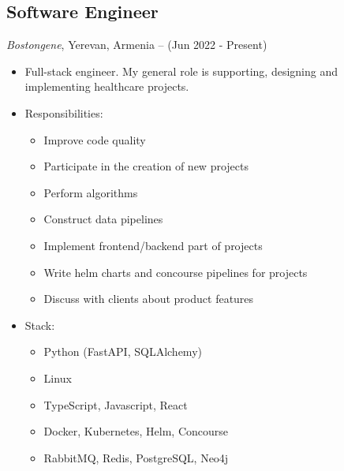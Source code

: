 \documentclass{article}
\begin{document}
\subsection*{Software Engineer}
\textit{Bostongene}, Yerevan, Armenia – (Jun 2022 - Present)
\begin{itemize}
    \item Full-stack engineer. My general role is supporting, designing and implementing healthcare projects. 
    \item Responsibilities:
    \begin{itemize}
        \item Improve code quality
        \item Participate in the creation of new projects
        \item Perform algorithms
        \item Construct data pipelines
        \item Implement frontend/backend part of projects
        \item Write helm charts and concourse pipelines for projects
        \item Discuss with clients about product features
    \end{itemize}
    \item Stack:
    \begin{itemize}
        \item Python (FastAPI, SQLAlchemy)
        \item Linux
        \item TypeScript, Javascript, React
        \item Docker, Kubernetes, Helm, Concourse
        \item RabbitMQ, Redis, PostgreSQL, Neo4j
    \end{itemize}
\end{itemize}
\end{document}
